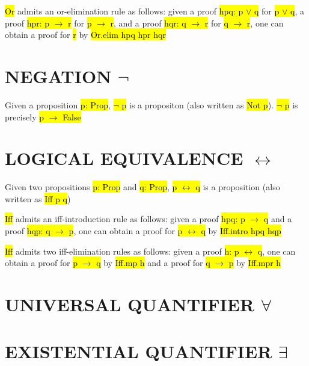 \hl{Or} admits an or-elimination rule as follows: given a proof \hl{hpq: p $\lor$ q} for \hl{p $\lor$ q}, a proof \hl{hpr: p $\to$ r} for \hl{p $\to$ r}, and a proof \hl{hqr: q $\to$ r} for \hl{q $\to$ r}, one can obtain a proof for \hl{r} by \hl{Or.elim hpq hpr hqr}

\section{NEGATION $\lnot$}

Given a proposition \hl{p: Prop}, \hl{$\lnot$ p} is a propositon (also written as \hl{Not p}). \hl{$\lnot$ p} is precisely \hl{p $\to$ False}

\section{LOGICAL EQUIVALENCE $\leftrightarrow$}

Given two propositions \hl{p: Prop} and \hl{q: Prop}, \hl{p $\leftrightarrow$ q} is a proposition (also written as \hl{Iff p q})

\hl{Iff} admits an iff-introduction rule as follows: given a proof \hl{hpq: p $\to$ q} and a proof \hl{hqp: q $\to$ p}, one can obtain a proof for \hl{p $\leftrightarrow$ q} by \hl{Iff.intro hpq hqp}

\hl{Iff} admits two iff-elimination rules as follows: given a proof \hl{h: p $\leftrightarrow$ q}, one can obtain a proof for \hl{p $\to$ q} by \hl{Iff.mp h} and a proof for \hl{q $\to$ p} by \hl{Iff.mpr h}


\section{UNIVERSAL QUANTIFIER $\forall$}

\section{EXISTENTIAL QUANTIFIER $\exists$}

